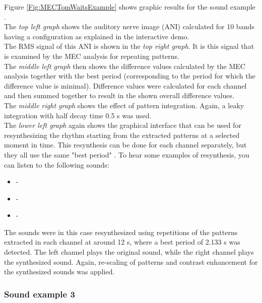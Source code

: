 Figure \ref{Fig:MECTomWaitsExample} shows graphic results for the
sound example .\\

The \emph{top left graph} shows the auditory nerve image (ANI)
calculated for 10 bands having a configuration as explained in the interactive demo.\\

The RMS signal of this ANI is shown in the \emph{top right graph}.
It is this signal that is examined by the MEC analysis for repeating patterns.\\

The \emph{middle left graph} then shows the difference values
calculated by the MEC analysis together with the best period
(corresponding to the period for which the difference value is
minimal). Difference values were calculated for each channel and
then summed together to result in the shown overall difference
values.\\

The \emph{middle right graph} shows the effect of  pattern
integration. Again, a leaky integration with half decay time 0.5 s
was used.\\

The \emph{lower left graph} again shows the graphical interface
that can be used for resynthesizing the rhythm starting from the
extracted patterns at a selected moment in time. This resynthesis
can be done for each channel separately, but they all use the same
"best period" . To hear some examples of resynthesis, you can
listen to the following sounds:
\begin{itemize}
\item[] - 
\item[] - 
\item[] - 
\end{itemize}
The sounds were in this case resynthesized using repetitions of
the patterns extracted in each channel at around 12 s, where a
best period of 2.133 s was detected. The left channel plays the
original sound, while the right channel plays the synthesized
sound. Again, re-scaling of patterns and contrast enhancement for
the synthesized sounds was applied.


\subsubsection*{Sound example 3}

